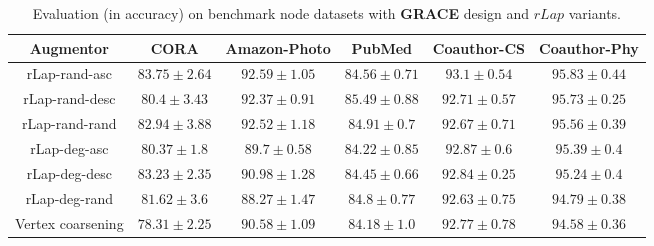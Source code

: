 \documentclass{article}
\theoremstyle{plain}
\theoremstyle{definition}
\theoremstyle{remark}
\begin{document}
\begin{table*}[ht!]
\centering
\caption{Evaluation (in accuracy) on benchmark node datasets with \textbf{GRACE} design and $rLap$ variants.}
\label{table:rlap_ablation_grace}
\vskip 0.15in
\begin{center}
\begin{small}
\begin{sc}
\begin{tabular}{c|c|c|c|c|c}
\toprule
Augmentor & CORA & Amazon-Photo & PubMed & Coauthor-CS & Coauthor-Phy \\
\midrule
rLap-rand-asc & $\mathbf{83.75 \pm 2.64}$ & $\mathbf{92.59 \pm 1.05}$ & $84.56 \pm 0.71$ &  $\mathbf{93.1 \pm 0.54}$  & $\mathbf{95.83 \pm 0.44}$ \\
rLap-rand-desc & $80.4 \pm 3.43$  & $92.37 \pm 0.91$ & $\mathbf{85.49 \pm 0.88}$ & $92.71 \pm 0.57$ &  \underline{$95.73 \pm 0.25$} \\
rLap-rand-rand & $82.94 \pm 3.88$ & \underline{$92.52 \pm 1.18$} & \underline{$84.91 \pm 0.7$} & $92.67 \pm 0.71$  & $95.56 \pm 0.39$ \\
rLap-deg-asc  & $80.37 \pm 1.8$   & $89.7 \pm 0.58$ & $84.22 \pm 0.85$ & \underline{$92.87 \pm 0.6$} & $95.39 \pm 0.4$  \\
rLap-deg-desc & \underline{$83.23 \pm 2.35$} &  $90.98 \pm 1.28$ & $84.45 \pm 0.66$ & $92.84 \pm 0.25$ & $95.24 \pm 0.4$ \\
rLap-deg-rand & $81.62 \pm 3.6$ & $88.27 \pm 1.47$ & $84.8 \pm 0.77$ & $92.63 \pm 0.75$ & $94.79 \pm 0.38$ \\
Vertex coarsening & $78.31 \pm 2.25$ & $90.58 \pm 1.09$ & $84.18 \pm 1.0$ & $92.77 \pm 0.78$ & $94.58 \pm 0.36$ \\
\bottomrule
\end{tabular}
\end{sc}
\end{small}
\end{center}
\vskip -0.1in
\end{table*}
\end{document}
